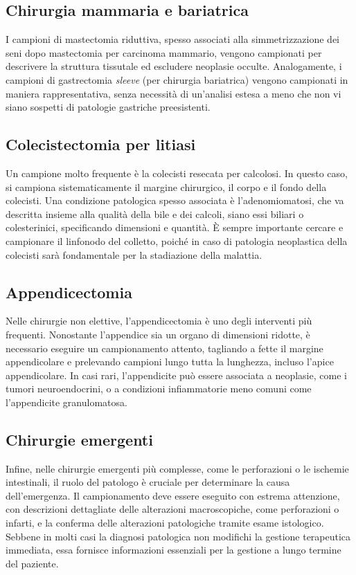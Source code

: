 \subsection{Chirurgia mammaria e bariatrica}
I campioni di mastectomia riduttiva, spesso associati alla simmetrizzazione dei seni dopo mastectomia per carcinoma mammario, vengono campionati per descrivere la struttura tissutale ed escludere neoplasie occulte. Analogamente, i campioni di gastrectomia \textit{sleeve} (per chirurgia bariatrica) vengono campionati in maniera rappresentativa, senza necessità di un'analisi estesa a meno che non vi siano sospetti di patologie gastriche preesistenti.

\subsection{Colecistectomia per litiasi}
Un campione molto frequente è la colecisti resecata per calcolosi. In questo caso, si campiona sistematicamente il margine chirurgico, il corpo e il fondo della colecisti. Una condizione patologica spesso associata è l'adenomiomatosi, che va descritta insieme alla qualità della bile e dei calcoli, siano essi biliari o colesterinici, specificando dimensioni e quantità. È sempre importante cercare e campionare il linfonodo del colletto, poiché in caso di patologia neoplastica della colecisti sarà fondamentale per la stadiazione della malattia.

\subsection{Appendicectomia}
Nelle chirurgie non elettive, l'appendicectomia è uno degli interventi più frequenti. Nonostante l'appendice sia un organo di dimensioni ridotte, è necessario eseguire un campionamento attento, tagliando a fette il margine appendicolare e prelevando campioni lungo tutta la lunghezza, incluso l'apice appendicolare. In casi rari, l'appendicite può essere associata a neoplasie, come i tumori neuroendocrini, o a condizioni infiammatorie meno comuni come l'appendicite granulomatosa.

\subsection{Chirurgie emergenti}
Infine, nelle chirurgie emergenti più complesse, come le perforazioni o le ischemie intestinali, il ruolo del patologo è cruciale per determinare la causa dell'emergenza. Il campionamento deve essere eseguito con estrema attenzione, con descrizioni dettagliate delle alterazioni macroscopiche, come perforazioni o infarti, e la conferma delle alterazioni patologiche tramite esame istologico. Sebbene in molti casi la diagnosi patologica non modifichi la gestione terapeutica immediata, essa fornisce informazioni essenziali per la gestione a lungo termine del paziente.

